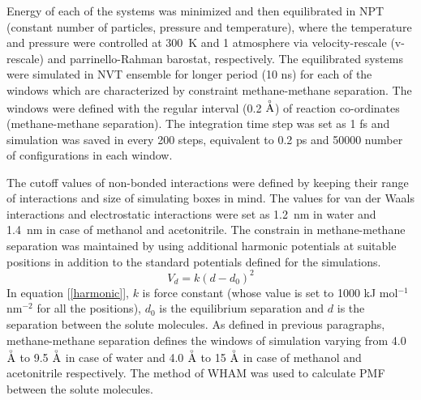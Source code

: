 Energy of each of the systems was minimized and then equilibrated in NPT (constant number of particles, pressure and temperature), where the temperature and pressure were controlled at 300~K and 1 atmosphere via velocity-rescale (v-rescale) and parrinello-Rahman barostat, respectively. The equilibrated systems were simulated in NVT ensemble for longer period (10 ns) for each of the windows which are characterized by constraint methane-methane separation. The windows were defined with the regular interval (0.2 $\buildrel _\circ \over {\mathrm{A}}$) of reaction co-ordinates (methane-methane separation). The integration time step was set as 1 fs and simulation was saved in every 200 steps, equivalent to 0.2 ps and 50000 number of configurations in each window. 

The cutoff values of non-bonded interactions were defined by keeping their range of interactions and size of simulating boxes in mind. The values for van der Waals interactions and electrostatic interactions were set as 1.2~nm in water and 1.4~nm in case of methanol and acetonitrile. The constrain in methane-methane separation was maintained by using additional harmonic potentials at suitable positions in addition to the standard potentials defined for the simulations.
\begin{equation}\label{harmonic}
V_d  =  k ( d - d_0 )^2
\end{equation}
In equation [\ref{harmonic}], $k$ is force constant (whose value is set to 1000 kJ mol$^{-1}$ nm$^{-2}$ for all the positions), $d_0$ is the equilibrium separation and $d$ is the separation between the solute molecules. As defined in previous paragraphs, methane-methane separation defines the windows of simulation varying from 4.0 $\buildrel _\circ \over {\mathrm{A}}$ to 9.5 $\buildrel _\circ \over {\mathrm{A}}$ in case of water and 4.0 $\buildrel _\circ \over {\mathrm{A}}$ to 15 $\buildrel _\circ \over {\mathrm{A}}$ in case of methanol and acetonitrile respectively. The method of WHAM was used to calculate PMF between the solute molecules.
\clearpage



